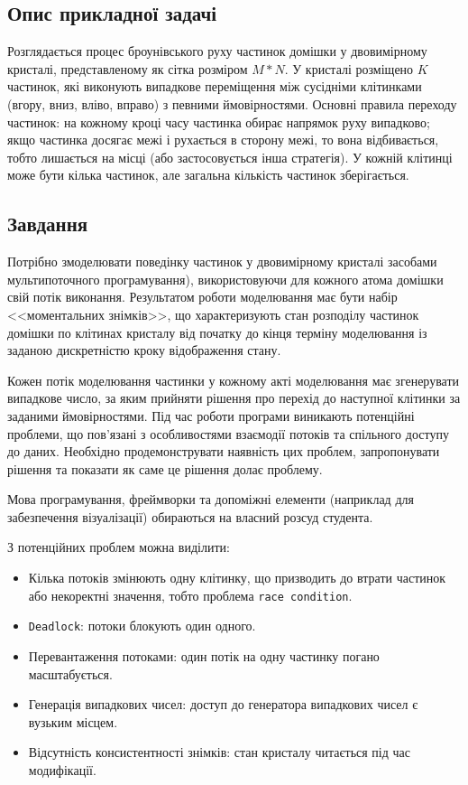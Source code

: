 \documentclass[14pt, a4paper]{extreport}
\begin{document}
	\subsection*{Опис прикладної задачі}
	
	Розглядається процес броунівського руху частинок домішки у двовимірному кристалі, представленому як сітка розміром $M \ast N$. У кристалі розміщено $K$ частинок, які виконують випадкове переміщення між сусідніми клітинками (вгору, вниз, вліво, вправо) з певними ймовірностями. Основні правила переходу частинок: на кожному кроці часу частинка обирає напрямок руху випадково; якщо частинка досягає межі і рухається в сторону межі, то вона відбивається, тобто лишається на місці (або застосовується інша стратегія). У кожній клітинці може бути кілька частинок, але загальна кількість частинок зберігається.
	
	\subsection*{Завдання}
	
	Потрібно змоделювати поведінку частинок у двовимірному кристалі засобами мультипоточного програмування), використовуючи для кожного атома домішки свій потік виконання. Результатом роботи моделювання має бути набір <<моментальних знімків>>, що характеризують стан розподілу частинок домішки по клітинах кристалу від початку до кінця терміну моделювання із заданою дискретністю кроку відображення стану.
	
	Кожен потік моделювання частинки у кожному акті моделювання має згенерувати випадкове число, за яким прийняти рішення про перехід до наступної клітинки за заданими ймовірностями. Під час роботи програми виникають потенційні проблеми, що пов'язані з особливостями взаємодії потоків та спільного доступу до даних. Необхідно продемонструвати наявність цих проблем, запропонувати рішення та показати як саме це рішення долає проблему.
	
	Мова програмування, фреймворки та допоміжні елементи (наприклад для забезпечення візуалізації) обираються на власний розсуд студента.
	
	З потенційних проблем можна виділити:
	
	\begin{itemize}
		\item Кілька потоків змінюють одну клітинку, що призводить до втрати частинок або некоректні значення, тобто проблема \texttt{race condition}.
		
		\item \texttt{Deadlock}: потоки блокують один одного.
		
		\item Перевантаження потоками: один потік на одну частинку погано масштабується.
		
		\item Генерація випадкових чисел: доступ до генератора випадкових чисел є вузьким місцем.
		
		\item Відсутність консистентності знімків: стан кристалу читається під час модифікації.
	\end{itemize}
	
\end{document}
